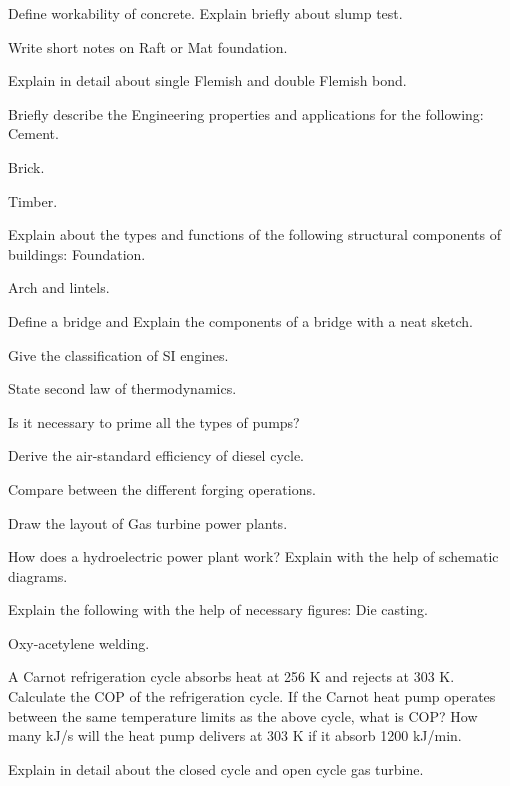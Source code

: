 \item Define workability of concrete. Explain briefly about slump test.  
\item Write short notes on Raft or Mat foundation. 

\partCo

\item \iitem Explain in detail about single Flemish and double Flemish bond.  
\Or
\item Briefly describe the Engineering properties and applications for the following:
\iitem Cement. \item Brick. \item Timber.  
\ene\ene

\item \iitem 
  Explain about the types and functions of the following structural components of buildings:
\iitem Foundation. \item Arch and lintels.  
\ene
\Or
\item Define a bridge and Explain the components of a bridge with a neat sketch.   
\ene
\ene

\newpage \again

\sectionB

\partA

\iitem Give the classification of SI engines.  
\item State second law of thermodynamics.  
\item Is it necessary to prime all the types of pumps?   \marka

\partBt

\item Derive the air-standard efficiency of diesel cycle.   
\item Compare between the different forging operations.  
\item Draw the layout of Gas turbine power plants.  

\partCo

\item \iitem How does a hydroelectric power plant work? Explain with the help of schematic diagrams.

\Or
\item Explain the following with the help of necessary figures:
\iitem Die casting.
\item Oxy-acetylene welding.  
\ene\ene


\item \iitem A Carnot refrigeration cycle absorbs heat at 256 K and rejects at 303 K. Calculate the COP of
the refrigeration cycle. If the Carnot heat pump operates between the same temperature limits as the
  above cycle, what is COP? How many kJ/s
  will the heat pump delivers at 303 K if it absorb 1200 kJ/min.   
\Or
\item Explain in detail about the closed cycle and open cycle gas turbine. 
\ene
\ene


